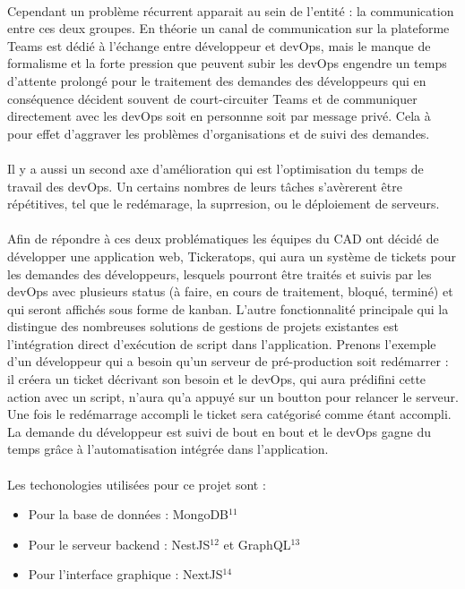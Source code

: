 \documentclass[12pt]{article}
\begin{document}
\begin {sloppypar}
\paragraph{}
Cependant un problème récurrent apparait au sein de l'entité : la communication entre ces deux 
groupes. En théorie un canal de communication sur la plateforme Teams est dédié à l'échange 
entre développeur et devOps, mais le manque de formalisme et la forte pression que peuvent 
subir les devOps engendre un temps d'attente prolongé pour le traitement des demandes des développeurs
qui en conséquence décident souvent de court-circuiter Teams et de communiquer directement
avec les devOps soit en personnne soit par message privé. Cela à pour effet d'aggraver les problèmes
d'organisations et de suivi des demandes. 
\paragraph{}
Il y a aussi un second axe d'amélioration qui est l'optimisation du temps de travail des devOps. 
Un certains nombres de leurs tâches s'avèrerent être répétitives, tel que le redémarage, la suprresion,
ou le déploiement de serveurs. 
\paragraph{}
Afin de répondre à ces deux problématiques les équipes du CAD ont décidé de développer une application web,
Tickeratops, qui aura un système de tickets pour les demandes des développeurs, lesquels pourront être
traités et suivis par les devOps avec plusieurs status (à faire, en cours de traitement, bloqué, terminé)
et qui seront affichés sous forme de kanban. L'autre fonctionnalité principale qui la distingue des 
nombreuses solutions de gestions de projets existantes est l'intégration direct d'exécution de script dans
l'application. Prenons l'exemple d'un développeur qui a besoin qu'un serveur de pré-production soit redémarrer : 
il créera un ticket décrivant son besoin et le devOps, qui aura prédifini cette action avec un script, n'aura qu'a 
appuyé sur un boutton pour relancer le serveur. Une fois le redémarrage accompli le ticket sera catégorisé 
comme étant accompli. La demande du développeur est suivi de bout en bout et le devOps gagne du temps 
grâce à l'automatisation intégrée dans l'application.

\newpage
\paragraph{}
Les techonologies utilisées pour ce projet sont : 
\begin{itemize}
  \item 
    Pour la base de données : MongoDB$^{11}$
  \item 
    Pour le serveur backend : NestJS$^{12}$ et GraphQL$^{13}$
  \item 
    Pour l'interface graphique : NextJS$^{14}$ 
\end{itemize}


\end{sloppypar}
\end{document}
